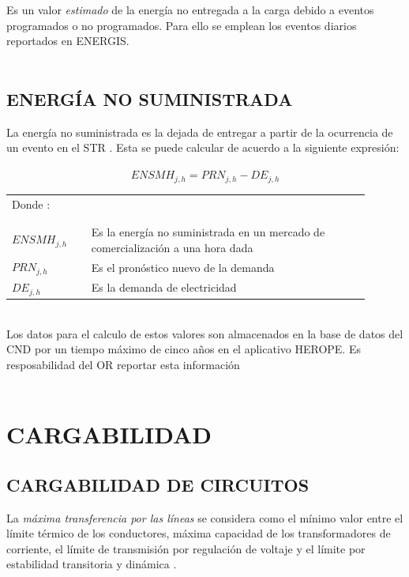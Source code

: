 \documentclass[a5paper]{book}%
\begin{document}
  Es un valor \textit{estimado} de la energía no entregada a la carga
  debido a eventos programados o no programados. Para ello se emplean
  los eventos diarios reportados en ENERGIS.\\\\

  \section{ENERGÍA NO SUMINISTRADA}

  La energía no suministrada es la dejada de entregar a partir de la
  ocurrencia de un evento en el \ac{STR} \cite{CREG0152018}. Esta se
  puede calcular de acuerdo a la siguiente expresión: \cite{CREG0942012}\\\\

  \[ ENSMH_{j,h} = PRN_{j,h} - DE_{j,h} \]

  \begin{tabular}{p{0.2\linewidth} p{0.7\linewidth}}
    Donde :\\\\& \\
    $ENSMH_{j,h}$& Es la energía no suministrada en  un mercado de comercialización a una hora dada \\
    $PRN_{j,h}$ & Es el pronóstico nuevo de la demanda\\
    $DE_{j,h}$ & Es la demanda de electricidad \\
  \end{tabular}\\

  
\hspace{1cm}
  Los datos para el calculo de estos valores son almacenados en la
  base de datos del CND por un tiempo máximo de cinco años en el
  aplicativo HEROPE. Es resposabilidad del OR reportar esta
  información\\\\
  
\chapter{CARGABILIDAD}
\section{CARGABILIDAD DE CIRCUITOS}
 La \textit{máxima transferencia por las líneas} se considera
  como el mínimo valor entre el límite térmico de los conductores,
  máxima capacidad de los transformadores de corriente, el límite de
  transmisión por regulación de voltaje y el límite por estabilidad
  transitoria y dinámica \cite{CREG0251995}.\\\\
\end{document}
